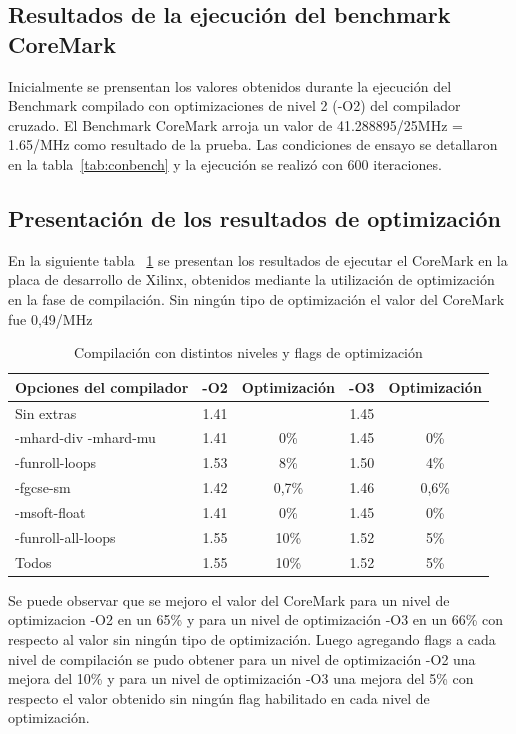 		\subsection{Resultados de la ejecución del benchmark CoreMark}
		
Inicialmente se prensentan los valores obtenidos durante la ejecución del Benchmark compilado con optimizaciones de nivel 2 (-O2) del
compilador cruzado. El Benchmark CoreMark arroja un valor de  41.288895/25MHz = 1.65/MHz como resultado de la prueba. Las condiciones de ensayo se
detallaron en la tabla~\ref{tab:conbench} y la ejecución se realizó con 600 iteraciones. 


	\subsection {Presentación de los resultados de optimización} 

En la siguiente tabla ~\ref{tab:conbench2} se presentan los resultados de ejecutar el CoreMark en la placa de desarrollo de Xilinx, obtenidos mediante la utilización de optimización en la fase de compilación. Sin ningún tipo de optimización el valor del CoreMark fue 0,49/MHz

\begin{table}[h!]
\begin{center}
\begin{tabular}{ |l |c |c |c |c|}
\hline
\rowcolor[gray]{0.8} Opciones del compilador&-O2& Optimización &-O3& Optimización \\
\hline
Sin extras 					& 1.41 	& 			& 1.45 &  \\
\hline
-mhard-div -mhard-mu 		& 1.41	& 0\%		& 1.45 & 0\% \\
\hline
-funroll-loops			 	& 1.53	& 8\%		& 1.50 & 4\%\\
\hline
-fgcse-sm					& 1.42	& 0,7\%		& 1.46 & 0,6\%\\
\hline
-msoft-float 				& 1.41	& 0\%		& 1.45 & 0\%\\
\hline
-funroll-all-loops	 		& 1.55	& 10\%		& 1.52 & 5\%\\
\hline
Todos	 					& 1.55	& 10\%		& 1.52 & 5\%\\
\hline
\end{tabular}
\end{center}
\caption{Compilación con distintos niveles y flags de optimización}
\label{tab:conbench2}
\end{table}


Se puede observar que se mejoro el valor del CoreMark para un nivel de optimizacion -O2 en un 65\% y para un nivel de optimización -O3 en un 66\% con respecto al valor sin ningún tipo de optimización. Luego agregando flags a cada nivel de compilación se pudo obtener para un nivel de optimización -O2 una mejora del 10\% y para un nivel de optimización -O3 una mejora del 5\%  con respecto el valor obtenido sin ningún flag habilitado en cada nivel de optimización. 


